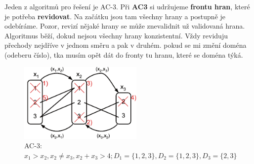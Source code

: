Jeden z algoritmů pro řešení je AC-3. Při \textbf{AC3} si udržujeme \textbf{frontu hran}, které je potřeba \textbf{revidovat}. Na začátku jsou tam všechny hrany a postupně je odebíráme. Pozor, revizí nějaké hrany se může znevalidnit už validovaná hrana. Algoritmus běží, dokud nejsou všechny hrany konzistentní. Vždy reviduju přechody nejdříve v jednom směru a pak v druhém. pokud se mi změní doména (odeberu číslo), tka musím opět dát do fronty tu hranu, které se doména týká.

\begin{figure}[h]
    \begin{center}
        \includegraphics[width=60mm]{spolecne/10/images/ac3}
    \end{center}
    \vspace{-10px}
    \caption{AC-3: $x_1 > x_2, x_2 \neq x_3, x_2+x_3 > 4; D_1 = \{1,2,3\}, D_2 = \{1,2,3\}, D_3 = \{2,3\}$}
\end{figure}
